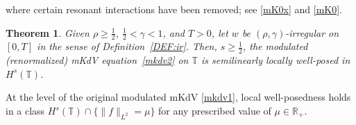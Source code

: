 \documentclass[letterpaper, 11pt,  reqno]{amsart}
\newtheorem{theorem}{Theorem} [section]
\newcommand{\1}{\hspace{0.5mm}\text{I}\hspace{0.5mm}}
\newcommand{\noi}{\noindent}
\newcommand{\R}{\mathbb{R}}
\newcommand{\T}{\mathbb{T}}
\newcommand{\g}{\gamma}
\numberwithin{equation}{section}
\numberwithin{theorem}{section}
\begin{document}
\noi
where certain resonant interactions have been removed;
see \eqref{mK0x} and \eqref{mK0}.




\begin{theorem}
\label{THM:3}
Given $\rho \ge \frac 12$,  $\frac12< \g < 1$, and $T> 0$, 
let  $w$ be $(\rho,\g)$-irregular on $[0, T]$ in the sense of Definition~\ref{DEF:ir}.
Then, $s\geq \frac 12$, 
the modulated \textup{(}renormalized\textup{)} mKdV equation~\eqref{mkdv2}
on $\T$
is semilinearly  locally well-posed in $H^s(\T)$.

\end{theorem}


At the level of the original modulated mKdV \eqref{mkdv1}, 
local well-posedness holds
in a class $H^s(\T) \cap \{ \|f \|_{L^2} = \mu\}$
for any prescribed value of  $\mu \in \R_+$.
\end{document}
